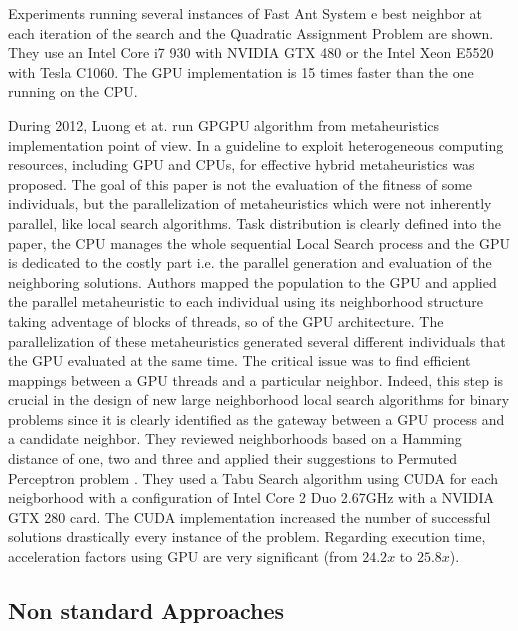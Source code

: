 \documentclass[prodmode,acmtecs]{acmsmall}
\begin{document}
Experiments running several instances of Fast Ant System \cite{Taillard:1998:FFA:870509}e best neighbor at each iteration of the search and the Quadratic Assignment Problem \cite{Zhu:2010:0020-7543:1035} are shown. They use an Intel Core i7 930 with NVIDIA GTX 480 or the Intel Xeon E5520 with Tesla C1060. The GPU implementation is 15 times faster than the one running on the CPU.


During 2012, Luong et at. run GPGPU algorithm from metaheuristics implementation point of view. In \cite{luongMetaheuristicsPpsn2012} a guideline to exploit heterogeneous computing resources, including GPU and CPUs, for effective hybrid metaheuristics was proposed. The goal of this paper is not the evaluation of the fitness of some individuals, but the parallelization of metaheuristics which were not inherently parallel, like local search algorithms. Task distribution is clearly defined into the paper,  the CPU manages the whole sequential Local Search process and the GPU is dedicated to the costly part i.e. the parallel generation and evaluation of the neighboring solutions.
Authors mapped the population to the GPU and applied the parallel metaheuristic to each individual using its neighborhood structure taking adventage of blocks of threads, so of the GPU architecture. The parallelization of these metaheuristics generated several different individuals that the GPU evaluated at the same time. The critical issue was to find efficient mappings between a GPU threads and a particular neighbor. Indeed, this step is crucial in the design of new large neighborhood local search algorithms for binary problems since it is clearly identified as the gateway between a GPU process and a candidate neighbor. They reviewed neighborhoods based on a Hamming distance of one, two and three and applied their suggestions to Permuted Perceptron problem \cite{KnudsenPermutedPerceptronProblem1999}. They used a Tabu Search algorithm \cite{TaillardTabySearch1991} using CUDA for each neigborhood with a configuration of Intel Core 2 Duo 2.67GHz with a NVIDIA GTX 280 card. The CUDA implementation increased the number of successful solutions drastically every instance of the problem. Regarding execution time, acceleration factors using GPU are very significant (from $24.2x$ to $25.8x$). 

   




\subsection{Non standard Approaches}
\end{document}
